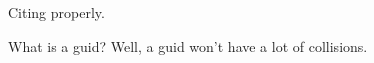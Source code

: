 \lipsum[4] Citing \cite{InfH} properly.

What is a \gls{guid}?
Well, a \gls{guid} won't have a lot of collisions.

